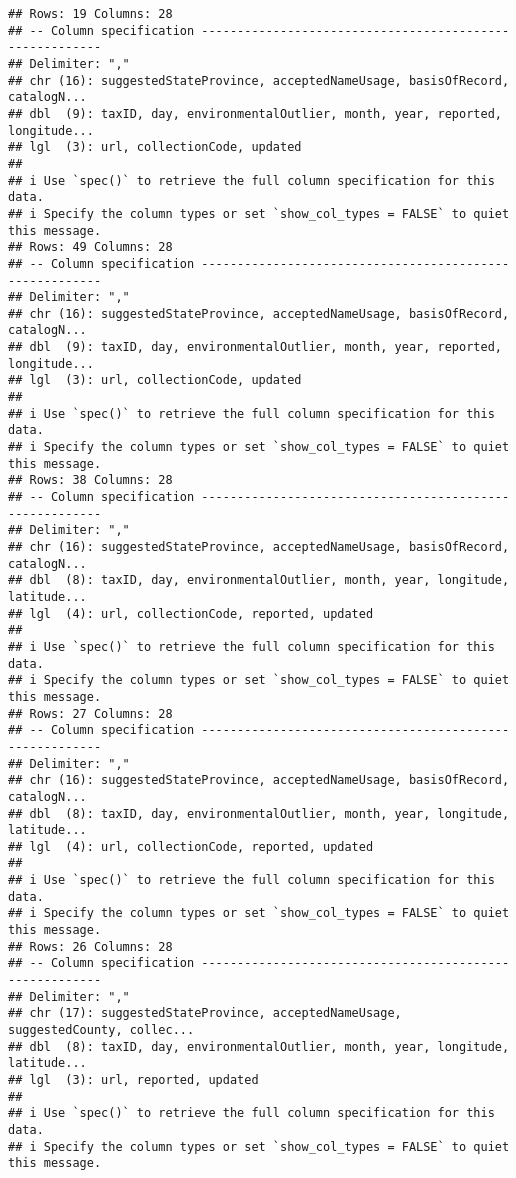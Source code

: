 \documentclass[
]{article}
\begin{document}
\begin{verbatim}
## Rows: 19 Columns: 28
## -- Column specification --------------------------------------------------------
## Delimiter: ","
## chr (16): suggestedStateProvince, acceptedNameUsage, basisOfRecord, catalogN...
## dbl  (9): taxID, day, environmentalOutlier, month, year, reported, longitude...
## lgl  (3): url, collectionCode, updated
## 
## i Use `spec()` to retrieve the full column specification for this data.
## i Specify the column types or set `show_col_types = FALSE` to quiet this message.
## Rows: 49 Columns: 28
## -- Column specification --------------------------------------------------------
## Delimiter: ","
## chr (16): suggestedStateProvince, acceptedNameUsage, basisOfRecord, catalogN...
## dbl  (9): taxID, day, environmentalOutlier, month, year, reported, longitude...
## lgl  (3): url, collectionCode, updated
## 
## i Use `spec()` to retrieve the full column specification for this data.
## i Specify the column types or set `show_col_types = FALSE` to quiet this message.
## Rows: 38 Columns: 28
## -- Column specification --------------------------------------------------------
## Delimiter: ","
## chr (16): suggestedStateProvince, acceptedNameUsage, basisOfRecord, catalogN...
## dbl  (8): taxID, day, environmentalOutlier, month, year, longitude, latitude...
## lgl  (4): url, collectionCode, reported, updated
## 
## i Use `spec()` to retrieve the full column specification for this data.
## i Specify the column types or set `show_col_types = FALSE` to quiet this message.
## Rows: 27 Columns: 28
## -- Column specification --------------------------------------------------------
## Delimiter: ","
## chr (16): suggestedStateProvince, acceptedNameUsage, basisOfRecord, catalogN...
## dbl  (8): taxID, day, environmentalOutlier, month, year, longitude, latitude...
## lgl  (4): url, collectionCode, reported, updated
## 
## i Use `spec()` to retrieve the full column specification for this data.
## i Specify the column types or set `show_col_types = FALSE` to quiet this message.
## Rows: 26 Columns: 28
## -- Column specification --------------------------------------------------------
## Delimiter: ","
## chr (17): suggestedStateProvince, acceptedNameUsage, suggestedCounty, collec...
## dbl  (8): taxID, day, environmentalOutlier, month, year, longitude, latitude...
## lgl  (3): url, reported, updated
## 
## i Use `spec()` to retrieve the full column specification for this data.
## i Specify the column types or set `show_col_types = FALSE` to quiet this message.
\end{verbatim}
\end{document}
